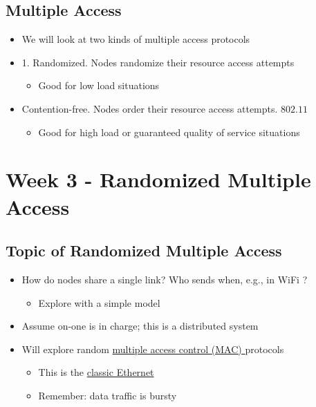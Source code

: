 \documentclass[12pt]{ctexart}   %
\begin{document}
	\subsection{Multiple Access}
	\begin{itemize}
		\item We will look at two kinds of multiple access protocols
		\item {\color{blue} 1.} Randomized. Nodes randomize their resource access attempts
		\begin{itemize}
			\item Good for low load situations
		\end{itemize}
		
		\item Contention-free. Nodes order their resource access attempts.      $ 802.11$
		\begin{itemize}
			\item Good for high load or guaranteed quality of service situations
		\end{itemize}
	\end{itemize}

\section{Week 3 - Randomized Multiple Access}
	\subsection{Topic of Randomized Multiple Access}
	\begin{itemize}
		\item How do nodes share a single link? Who sends when, e.g., in WiFi ?
		\begin{itemize}
			\item Explore with a simple model
		\end{itemize}
		
		\item Assume on-one is in charge; this is a distributed system
		
		\item Will explore random \underline{multiple access control (MAC) } protocols
		\begin{itemize}
			\item This is the \underline{classic Ethernet}
			\item Remember: data traffic is bursty
		\end{itemize}
	\end{itemize}
	
\end{document}
